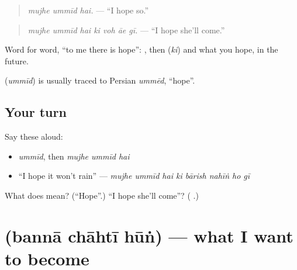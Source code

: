 \begin{quote}
\emph{mujhe ummīd hai.} — \textquotedblleft{}I hope so.\textquotedblright{}
\end{quote}

\begin{quote}
\textbf{      }
\end{quote}

\begin{quote}
\emph{mujhe ummīd hai ki voh āe gī.} — \textquotedblleft{}I hope she'll come.\textquotedblright{}
\end{quote}

Word for word, \textquotedblleft{}to me there is hope\textquotedblright{}: \textbf{}, then \textbf{} (\emph{ki}) and what you hope, in the future.

\begin{cousinweb}
\textbf{} (\emph{ummīd}) is usually traced to Persian \emph{ummēd}, \textquotedblleft{}hope\textquotedblright{}.
\end{cousinweb}

\subsection*{Your turn}
Say these aloud:

\begin{itemize}
\raggedright
  \item \emph{ummīd}, then \emph{mujhe ummīd hai}
  \item \textquotedblleft{}I hope it won't rain\textquotedblright{} — \emph{mujhe ummīd hai ki bārish nahīṅ ho gī}
\end{itemize}

\begin{tcolorbox}[breakable,colback=teal!4,colframe=teal!35!black,title={Before you move on}]
What does \textbf{} mean? (\textquotedblleft{}Hope\textquotedblright{}.) \textquotedblleft{}I hope she'll come\textquotedblright{}? (\textbf{      }.)
\end{tcolorbox}
\section[\texorpdfstring{\ur{بننا} \ur{چاہتی} \ur{ہوں} (bannā chāhtī hūṅ)}{بننا چاہتی ہوں (bannā chāhtī hūṅ)}]{   (bannā chāhtī hūṅ) — what I want to become}

